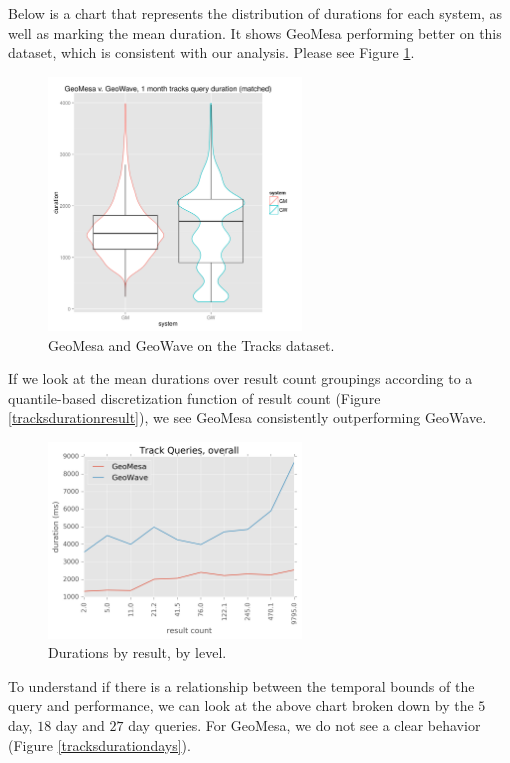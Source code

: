 Below is a chart that represents the distribution of durations for each system, as well as marking the mean duration.
It shows GeoMesa performing better on this dataset, which is consistent with our analysis.
Please see Figure \ref{tracksgmgw}.

\begin{figure}[h!tb]
  \centering
  \includegraphics[width=0.60\textwidth]{../docs/img/tracks/GM_GW_tracks_duration_matched_1month.png}
  \caption{GeoMesa and GeoWave on the Tracks dataset.}
  \label{tracksgmgw}
\end{figure}

If we look at the mean durations over result count groupings according to a quantile-based discretization function of result count
(Figure \ref{tracksdurationresult}),
we see GeoMesa consistently outperforming GeoWave.

\begin{figure}[h!tb]
  \centering
  \includegraphics[width=0.60\textwidth]{../docs/img/tracks/duration-by-result-count.png}
  \caption{Durations by result, by level.}
  \label{tracksduration}
\end{figure}

To understand if there is a relationship between the temporal bounds of the query and performance,
we can look at the above chart broken down by the $5$ day, $18$ day and $27$ day queries.
For GeoMesa, we do not see a clear behavior (Figure \ref{tracksdurationdays}).

